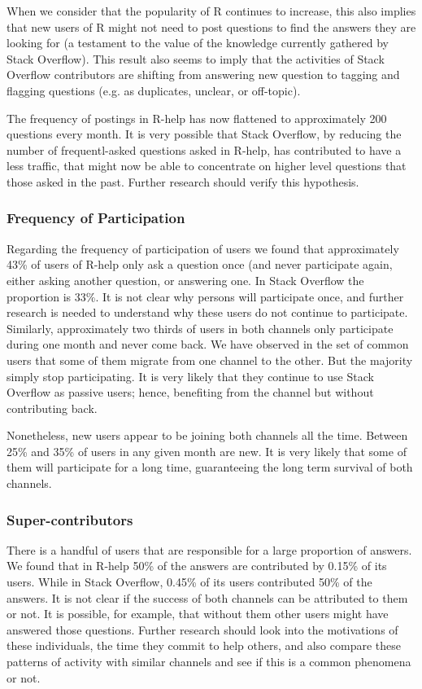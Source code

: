 \documentclass[smallextended]{svjour3}       %
\newcommand{\SO}{Stack Overflow\xspace}
\newcommand{\RH}{R-help\xspace}
\begin{document}
When we consider that the popularity of R continues to increase, this also implies that new users of R might not need to
post questions to find the answers they are looking for (a testament to the value of the knowledge currently gathered by
\SO). This result also seems to imply that the activities of \SO contributors are shifting from answering new question to
tagging and flagging questions  (e.g. as  duplicates, unclear, or off-topic).

The frequency of postings in \RH has now flattened to approximately 200 questions every month. It is very possible that
\SO, by reducing the number of frequentl-asked questions asked in \RH, has contributed to have a less traffic, that
might now be able to concentrate on higher level questions that those asked in the past. Further research should verify
this hypothesis.


\subsubsection{Frequency of Participation}

Regarding the frequency of participation of users we found that approximately 43\% of users of \RH only ask a question
once (and never participate again, either asking another question, or answering one. In
\SO the proportion is 33\%. It is not clear why persons will participate once, and further research is needed to
understand why these users do not continue to participate. Similarly, approximately two thirds of users in both channels
only participate during one month and never come back. We have observed in the set of common users that some of them
migrate from one channel to the other. But the majority simply stop participating. It is very likely that they continue
to use \SO as passive users; hence, benefiting from the channel but without contributing back.

Nonetheless, new users appear to be joining both channels all the time. Between 25\% and 35\% of users in any given month
are new. It is very likely that some of them will participate for a long time, guaranteeing the long term survival of
both channels.

\subsubsection{Super-contributors}

There is a handful of users that are responsible for a large proportion of answers. We found that in \RH 50\% of the
answers are contributed by 0.15\% of its users. While in \SO, 0.45\% of its users contributed 50\% of the answers. It is
not clear if the success of both channels can be attributed to them or not. It is possible, for example, that without
them other users might have answered those questions. Further research should look into the motivations of these
individuals, the time they commit to help others, and also compare these patterns of activity with similar channels and
see if this is a common phenomena or not.
\end{document}

